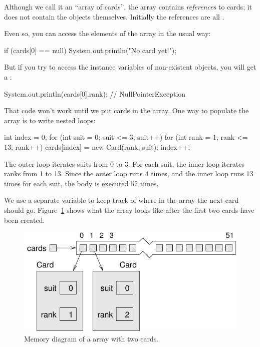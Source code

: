 

Although we call it an ``array of cards'', the array contains {\em references} to cards; it does not contain the  objects themselves.
Initially the references are all .

Even so, you can access the elements of the array in the usual way:

\begin{code}
if (cards[0] == null) {
    System.out.println("No card yet!");
}
\end{code}


But if you try to access the instance variables of non-existent  objects, you will get a :

\begin{code}
System.out.println(cards[0].rank);  // NullPointerException
\end{code}


That code won't work until we put cards in the array.
One way to populate the array is to write nested  loops:

\begin{code}
int index = 0;
for (int suit = 0; suit <= 3; suit++) {
    for (int rank = 1; rank <= 13; rank++) {
        cards[index] = new Card(rank, suit);
        index++;
    }
}
\end{code}

The outer loop iterates suits from 0 to 3.
For each suit, the inner loop iterates ranks from 1 to 13.
Since the outer loop runs 4 times, and the inner loop runs 13 times for each suit, the body is executed 52 times.


We use a separate variable  to keep track of where in the array the next card should go.
Figure~\ref{fig.cardarray2} shows what the array looks like after the first two cards have been created.

\begin{figure}[!ht]
\begin{center}
\includegraphics{figs/cardarray2.pdf}
\caption{Memory diagram of a  array with two cards.}
\label{fig.cardarray2}
\end{center}
\end{figure}

